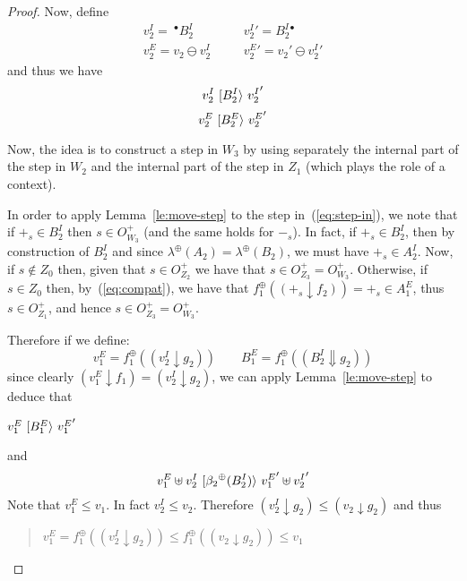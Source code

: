 \documentclass{LMCS}
\newcommand{\mjoin}{\ensuremath{\uplus}}
\newcommand{\mon}[1]{\ensuremath{{#1}^\oplus}}
\newcommand{\monSub}[2]{\ensuremath{{#1}_{#2}^\oplus}}
\newcommand{\res}[2]{\ensuremath{({#1}\!\downarrow\!{#2})}}
\newcommand{\sres}[2]{\ensuremath{({#1}\!\Downarrow\!{#2})}}
\newcommand{\pre}[1][(\cdot)]{\ensuremath{\!~^\bullet{#1}}}
\newcommand{\post}[1][(\cdot)]{\ensuremath{{#1} {^\bullet}}}
\newcommand{\trans}[1]{\ensuremath{\ [\/{#1}\/\rangle}\ }
\begin{document}
\begin{proof}
  Now, define
  \begin{eqnarray}
    \label{eq:B2}
    v_2^I = \pre[B_2^I] & \quad & {v_2^I}' = \post[B_2^I]\\
    \label{eq:v2}
    v_2^E = v_2 \ominus v_2^I &  &  {v_2^E}' = v_2' \ominus {v_2^I}'
  \end{eqnarray}
  and thus we have
  \begin{equation}
    \label{eq:step-in}
    v_2^I \trans{B_2^I} {v_2^I}'
  \end{equation}
  \begin{equation}
    \label{eq:step-ext}
    v_2^E \trans{B_2^E} {v_2^E}'
  \end{equation}
  

  Now, the idea is to construct a step in $W_3$ by using
  separately the internal part of the step in $W_2$ and the internal
  part of the step in $Z_1$ (which plays the role of a context).


  \medskip

  In order to apply Lemma~\ref{le:move-step} to the step
  in~(\ref{eq:step-in}), we note that if $+_s \in B_2^I$ then $s \in
  O_{W_3}^+$ (and the same holds for $-_s$).
In fact, if $+_s \in B_2^I$, then by construction of $B_2^I$ and
  since $\mon{\lambda}(A_2) = \mon{\lambda}(B_2)$, we must have $+_s
  \in A_2^I$. Now, if $s \not\in Z_0$ then, given that $s \in
  O_{Z_2}^+$ we have that $s \in O_{Z_3}^+ = O_{W_3}^+$. Otherwise, if
  $s \in Z_0$ then, by~(\ref{eq:compat}), we have that
  $\monSub{f}{1}(\res{+_s}{f_2}) = +_s \in A_1^E$,  thus $s \in O_{Z_1}^+$, and
  hence $s \in O_{Z_3}^+ = O_{W_3}^+$.

  Therefore if we define:
  \begin{equation}
    \label{eq:v1E}
    v_1^E = \monSub{f}{1}(\res{v_2^I}{g_2}) \qquad
    B_1^E =  \monSub{f}{1}(\sres{B_2^I}{g_2})
  \end{equation}
  since clearly $\res{v_1^E}{f_1} = \res{v_2^I}{g_2}$,
  we can apply Lemma~\ref{le:move-step} to deduce that
  \begin{center}
    $v_1^E \trans{B_1^E} {v_1^E}'$
  \end{center}
  and
  \begin{equation}
    \label{eq:int1}
    v_1^E \mjoin v_2^I \trans{\mon{\beta_2}(B_2^I)} {v_1^E}' \mjoin {v_2^I}'
  \end{equation}
Note that $v_1^E \leq v_1$. In fact $v_2^I \leq v_2$. Therefore 
  $\res{v_2^I}{g_2} \leq \res{v_2}{g_2}$ and thus
  \begin{quote}
    $v_1^E = \monSub{f}{1}(\res{v_2^I}{g_2}) \leq \monSub{f}{1}(\res{v_2}{g_2}) \leq v_1$
  \end{quote}
  

\end{proof}
\end{document}
